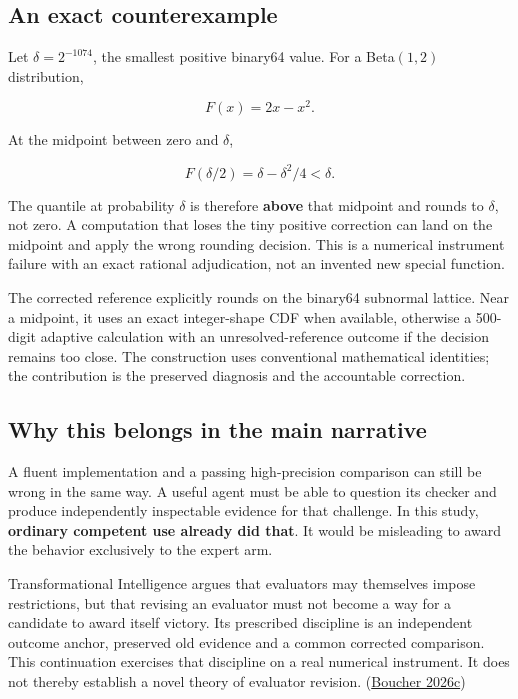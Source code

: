 \documentclass[
  10pt,
]{article}
\begin{document}
\hypertarget{an-exact-counterexample}{%
\subsection{An exact counterexample}\label{an-exact-counterexample}}

Let \(\delta=2^{-1074}\), the smallest positive binary64 value. For a
Beta\((1,2)\) distribution,

\[
F(x)=2x-x^2.
\]

At the midpoint between zero and \(\delta\),

\[
F(\delta/2)=\delta-\delta^2/4<\delta.
\]

The quantile at probability \(\delta\) is therefore \textbf{above} that
midpoint and rounds to \(\delta\), not zero. A computation that loses
the tiny positive correction can land on the midpoint and apply the
wrong rounding decision. This is a numerical instrument failure with an
exact rational adjudication, not an invented new special function.

The corrected reference explicitly rounds on the binary64 subnormal
lattice. Near a midpoint, it uses an exact integer-shape CDF when
available, otherwise a 500-digit adaptive calculation with an
unresolved-reference outcome if the decision remains too close. The
construction uses conventional mathematical identities; the contribution
is the preserved diagnosis and the accountable correction.

\hypertarget{why-this-belongs-in-the-main-narrative}{%
\subsection{Why this belongs in the main
narrative}\label{why-this-belongs-in-the-main-narrative}}

A fluent implementation and a passing high-precision comparison can
still be wrong in the same way. A useful agent must be able to question
its checker and produce independently inspectable evidence for that
challenge. In this study, \textbf{ordinary competent use already did
that}. It would be misleading to award the behavior exclusively to the
expert arm.

Transformational Intelligence argues that evaluators may themselves
impose restrictions, but that revising an evaluator must not become a
way for a candidate to award itself victory. Its prescribed discipline
is an independent outcome anchor, preserved old evidence and a common
corrected comparison. This continuation exercises that discipline on a
real numerical instrument. It does not thereby establish a novel theory
of evaluator revision. (\protect\hyperlink{ref-ti}{Boucher 2026c})
\end{document}

